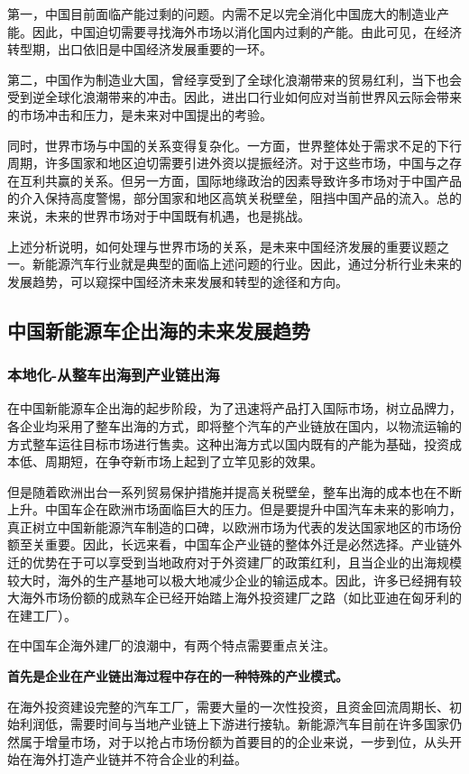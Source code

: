 \documentclass[a4paper, 10pt]{article}
\begin{document}
    第一，中国目前面临产能过剩的问题。内需不足以完全消化中国庞大的制造业产能。因此，中国迫切需要寻找海外市场以消化国内过剩的产能。由此可见，在经济转型期，出口依旧是中国经济发展重要的一环。

    第二，中国作为制造业大国，曾经享受到了全球化浪潮带来的贸易红利，当下也会受到逆全球化浪潮带来的冲击。因此，进出口行业如何应对当前世界风云际会带来的市场冲击和压力，是未来对中国提出的考验。
    
    同时，世界市场与中国的关系变得复杂化。一方面，世界整体处于需求不足的下行周期，许多国家和地区迫切需要引进外资以提振经济。对于这些市场，中国与之存在互利共赢的关系。但另一方面，国际地缘政治的因素导致许多市场对于中国产品的介入保持高度警惕，部分国家和地区高筑关税壁垒，阻挡中国产品的流入。总的来说，未来的世界市场对于中国既有机遇，也是挑战。

    上述分析说明，如何处理与世界市场的关系，是未来中国经济发展的重要议题之一。新能源汽车行业就是典型的面临上述问题的行业。因此，通过分析行业未来的发展趋势，可以窥探中国经济未来发展和转型的途径和方向。
    \subsection{中国新能源车企出海的未来发展趋势}
    \subsubsection{本地化-从整车出海到产业链出海}
    在中国新能源车企出海的起步阶段，为了迅速将产品打入国际市场，树立品牌力，各企业均采用了整车出海的方式，即将整个汽车的产业链放在国内，以物流运输的方式整车运往目标市场进行售卖。这种出海方式以国内既有的产能为基础，投资成本低、周期短，在争夺新市场上起到了立竿见影的效果。

    但是随着欧洲出台一系列贸易保护措施并提高关税壁垒，整车出海的成本也在不断上升。中国车企在欧洲市场面临巨大的压力。但是要提升中国汽车未来的影响力，真正树立中国新能源汽车制造的口碑，以欧洲市场为代表的发达国家地区的市场份额至关重要。因此，长远来看，中国车企产业链的整体外迁是必然选择。产业链外迁的优势在于可以享受到当地政府对于外资建厂的政策红利，且当企业的出海规模较大时，海外的生产基地可以极大地减少企业的输运成本。因此，许多已经拥有较大海外市场份额的成熟车企已经开始踏上海外投资建厂之路（如比亚迪在匈牙利的在建工厂）。

    在中国车企海外建厂的浪潮中，有两个特点需要重点关注。

    \textbf{首先是企业在产业链出海过程中存在的一种特殊的产业模式。}

在海外投资建设完整的汽车工厂，需要大量的一次性投资，且资金回流周期长、初始利润低，需要时间与当地产业链上下游进行接轨。新能源汽车目前在许多国家仍然属于增量市场，对于以抢占市场份额为首要目的的企业来说，一步到位，从头开始在海外打造产业链并不符合企业的利益。
\end{document}
